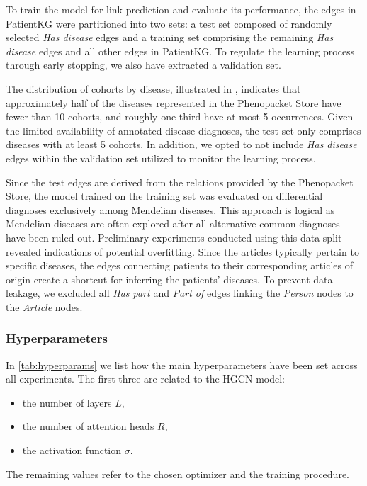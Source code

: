 To train the model for link prediction and evaluate its performance, the edges in PatientKG were partitioned into two sets: a test set composed of randomly selected \emph{Has disease} edges and a training set comprising the remaining \emph{Has disease} edges and all other edges in PatientKG. To regulate the learning process through early stopping, we also have extracted a validation set.

The distribution of cohorts by disease, illustrated in , indicates that approximately half of the diseases represented in the Phenopacket Store have fewer than 10 cohorts, and roughly one-third have at most 5 occurrences. Given the limited availability of annotated disease diagnoses, the test set only comprises diseases with at least 5 cohorts. In addition, we opted to not include \emph{Has disease} edges within the validation set utilized to monitor the learning process.

Since the test edges are derived from the relations provided by the Phenopacket Store, the model trained on the training set was evaluated on differential diagnoses exclusively among Mendelian diseases. This approach is logical as Mendelian diseases are often explored after all alternative common diagnoses have been ruled out. Preliminary experiments conducted using this data split revealed indications of potential overfitting. Since the articles typically pertain to specific diseases, the edges connecting patients to their corresponding articles of origin create a shortcut for inferring the patients' diseases. To prevent data leakage, we excluded all \emph{Has part} and \emph{Part of} edges linking the \emph{Person} nodes to the \emph{Article} nodes.

\medskip

\subsubsection{Hyperparameters}



In \cref{tab:hyperparams} we list how the main hyperparameters have been set across all experiments. The first three are related to the HGCN model:
\begin{itemize}
  \item the number of layers $L$,
  \item the number of attention heads $R$,
  \item the activation function $\sigma$.
\end{itemize}
The remaining values refer to the chosen optimizer and the training procedure.

